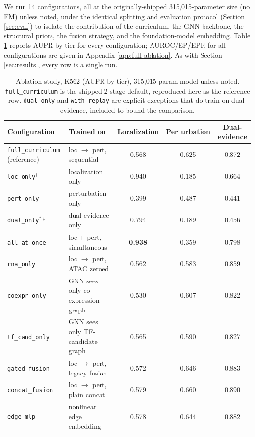 \documentclass{article}
\theoremstyle{plain}
\theoremstyle{definition}
\begin{document}
We run 14 configurations, all at the originally-shipped 315{,}015-parameter
size (no FM) unless noted, under the identical splitting and evaluation
protocol (Section \ref{sec:eval}) to isolate the contribution of the
curriculum, the GNN backbone, the structural priors, the fusion strategy,
and the foundation-model embedding. Table \ref{tab:ablation} reports AUPR
by tier for every configuration; AUROC/EP/EPR for all configurations are
given in Appendix \ref{app:full-ablation}. As with Section
\ref{sec:results}, every row is a single run.

\begin{table}[t]
\caption{Ablation study, K562 (AUPR by tier), 315{,}015-param model unless noted. \texttt{full\_curriculum} is the
shipped 2-stage default, reproduced here as the reference row. \texttt{dual\_only} and \texttt{with\_replay} are
explicit exceptions that do train on dual-evidence, included to bound the comparison.}
\label{tab:ablation}
\vskip 0.1in
\begin{center}
\begin{small}
\begin{tabular}{llccc}
\toprule
Configuration & Trained on & Localization & Perturbation & Dual-evidence \\
\midrule
\texttt{full\_curriculum} (reference) & loc $\to$ pert, sequential & 0.568 & 0.625 & 0.872 \\
\texttt{loc\_only}$^\ddagger$ & localization only & 0.940 & 0.185 & 0.664 \\
\texttt{pert\_only}$^\ddagger$ & perturbation only & 0.399 & 0.487 & 0.441 \\
\texttt{dual\_only}$^{*\ddagger}$ & dual-evidence only & 0.794 & 0.189 & 0.456 \\
\texttt{all\_at\_once} & loc + pert, simultaneous & \textbf{0.938} & 0.359 & 0.798 \\
\texttt{rna\_only} & loc $\to$ pert, ATAC zeroed & 0.562 & 0.583 & 0.859 \\
\texttt{coexpr\_only} & GNN sees only co-expression graph & 0.530 & 0.607 & 0.822 \\
\texttt{tf\_cand\_only} & GNN sees only TF-candidate graph & 0.565 & 0.590 & 0.827 \\
\texttt{gated\_fusion} & loc $\to$ pert, legacy fusion & 0.572 & 0.646 & 0.883 \\
\texttt{concat\_fusion} & loc $\to$ pert, plain concat & 0.579 & 0.660 & 0.890 \\
\texttt{edge\_mlp} & nonlinear edge embedding & 0.578 & 0.644 & 0.882 \\

\end{tabular}
\end{small}
\end{center}
\end{table}
\end{document}
